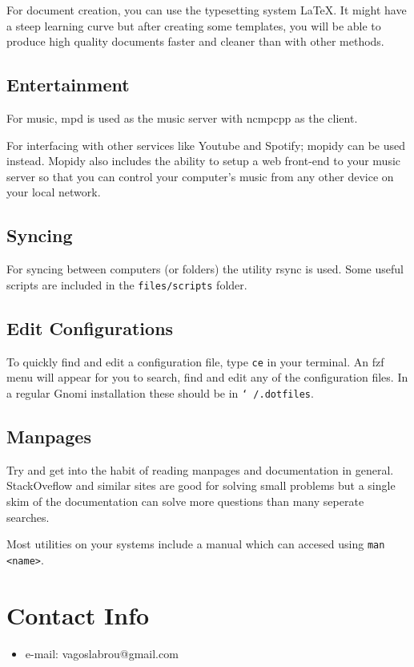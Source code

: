\documentclass{article}
\newcommand{\ttt}[1]{\texttt{#1}}
\newcommand{\sys}{Gnomi\xspace}
\begin{document}
For document creation, you can use the typesetting system \LaTeX. 
It might have a steep learning curve but after creating some templates, 
you will be able to produce high quality documents faster and cleaner 
than with other methods.

\subsection{Entertainment}
For music, mpd is used as the music server with ncmpcpp
as the client. 

For interfacing with other services like Youtube and Spotify;
mopidy can be used instead. Mopidy also includes the ability to setup a web front-end to your music server 
so that you can control your computer's music from any other device on your local network.

\subsection{Syncing}

For syncing between computers (or folders) the utility rsync is used. 
Some useful scripts are included in the \ttt{files/scripts} folder.

\subsection{Edit Configurations}

To quickly find and edit a configuration file, type 
\ttt{ce} in your terminal. An fzf menu will appear for you 
to search, find and edit any of the configuration files. 
In a regular \sys installation these should be 
in \ttt{\char`~/.dotfiles}.

\subsection{Manpages}

Try and get into the habit of reading manpages and documentation in general.
StackOveflow and similar sites are good for solving small problems but a single 
skim of the documentation can solve more questions than many seperate searches.

Most utilities on your systems include a manual which can accesed using \ttt{man <name>}.


\section{Contact Info}

\begin{itemize}
    \item e-mail: vagoslabrou@gmail.com
\end{itemize}

\end{document}
